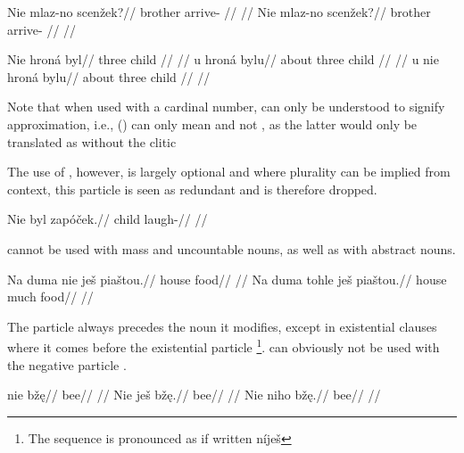 \pex
\begingl
    \gla Nie mlaz-no scen\v{z}ek?//
    \glb {} brother arrive- //
    \glft {}//
\endgl
\xe
\pex
\begingl
    \gla Nie mlaz-no scen\v{z}ek?//
    \glb {} brother arrive- //
    \glft {}//
\endgl
\xe

\pex
\a
\begingl{}
    \gla Nie hron\'a byl//
    \glb {} three child //
    \glft {}//
\endgl
\a
\begingl
    \gla u hron\'a bylu//
    \glb about  three child //
    \glft {}//
\endgl
\a
\begingl
    \gla u nie hron\'a bylu//
    \glb about  three child //
    \glft {}//
\endgl
\xe

Note that when used with a cardinal number,  can only be understood to signify approximation, i.e., () can only mean  and not , as the latter would only be translated as  without the clitic 




The use of , however, is largely optional and where plurality can be implied from context, this particle is seen as redundant and is therefore dropped.

\pex
\begingl
\gla Nie byl zap\'o\v{c}ek.//
\glb {} child laugh-//
\glft {}//
\endgl
\xe

 cannot be used with mass and uncountable nouns, as well as with abstract nouns.

\pex
\a
\begingl
\gla *Na duma nie je\v{s} pia\v{s}tou.//
\glb {} house   food//
\glft {}//
\endgl
\a
\begingl
\gla Na duma tohle je\v{s} pia\v{s}tou.//
\glb {} house much  food//
\glft {}//
\endgl
\xe

The particle  always precedes the noun it modifies, except in existential clauses where it comes before the existential particle \footnote{The sequence is pronounced as if written n\'ije\v{s} }.  can obviously not be used with the negative particle .

\pex
\a
\begingl
\gla nie b\v{z}\k{e}//
\glb {} bee//
\glft {}//
\endgl
\a
\begingl
\gla Nie je\v{s} b\v{z}\k{e}.//
\glb {}  bee//
\glft {}//
\endgl
\a
\begingl
\gla *Nie niho b\v{z}\k{e}.//
\glb {}  bee//
\glft {}//
\endgl
\xe

